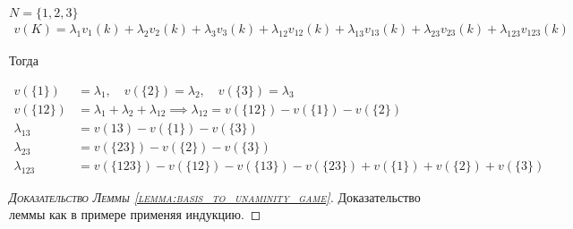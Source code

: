 \documentclass[../main.tex]{subfiles}
\begin{document}
\begin{exmpl}
	$N = \{1, 2, 3\}$
	\begin{align*}
		v(K) = \lambda_1 v_1(k) + \lambda_2 v_2(k) + \lambda_3 v_3(k) + \lambda_{12} v_{12}(k) + \lambda_{13}v_{13}(k) + \lambda_{23} v_{23}(k) + \lambda_{123} v_{123}(k)
	\end{align*}

	Тогда 

	\begin{align*}
		v(\{1\}) &= \lambda_1, \quad v(\{2\}) = \lambda_2, \quad v(\{3\}) = \lambda_3 \\
		v(\{12\}) &= \lambda_1 + \lambda_2 + \lambda_{12} \implies \lambda_{12} = v(\{12\}) - v(\{1\}) - v(\{2\}) \\
		\lambda_{13} &= v({13}) - v(\{1\}) - v(\{3\}) \\
		\lambda_{23} &= v(\{23\}) - v(\{2\}) - v(\{3\}) \\
		\lambda_{123} &= v(\{123\}) - v(\{12\}) - v(\{13\}) - v(\{23\}) + v(\{1\}) + v(\{2\}) + v(\{3\})
	\end{align*}
\end{exmpl}

\begin{proof}[\normalfont\textsc{Доказательство Леммы \ref{lemma:basis_to_unaminity_game}}]
	Доказательство леммы как в примере применяя индукцию.
\end{proof}
\end{document}
